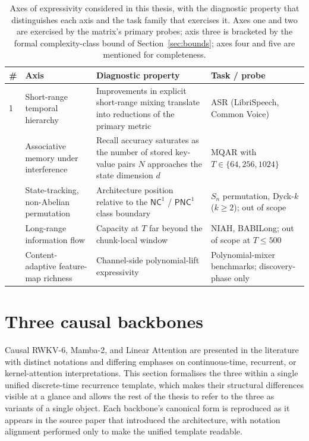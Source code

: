\begin{table}[t]
\centering
\small
\caption[Axes of expressivity for causal linear-time RNNs]{Axes
of expressivity considered in this thesis, with the diagnostic
property that distinguishes each axis and the task family that
exercises it. Axes one and two are exercised by the matrix's
primary probes; axis three is bracketed by the formal
complexity-class bound of Section~\ref{sec:bounds}; axes four
and five are mentioned for completeness.}
\label{tab:axes}
\setlength{\tabcolsep}{4pt}
\renewcommand{\arraystretch}{1.15}
\begin{tabularx}{\linewidth}{@{}p{0.4cm} p{3.0cm} X p{3.0cm}@{}}
\toprule
\textbf{\#} & \textbf{Axis} & \textbf{Diagnostic property} & \textbf{Task / probe} \\
\midrule
1 &
Short-range temporal hierarchy &
Improvements in explicit short-range mixing translate into
reductions of the primary metric &
ASR (LibriSpeech, Common Voice) \\
\addlinespace
2 &
Associative memory under interference &
Recall accuracy saturates as the number of stored key-value pairs
$N$ approaches the state dimension $d$ &
MQAR with $T \in \{64, 256, 1024\}$ \\
\addlinespace
3 &
State-tracking, non-Abelian permutation &
Architecture position relative to the $\mathsf{NC}^{1}$ /
$\mathsf{PNC}^{1}$ class boundary &
$S_{n}$ permutation, Dyck-$k$ ($k \ge 2$); out of scope \\
\addlinespace
4 &
Long-range information flow &
Capacity at $T$ far beyond the chunk-local window &
NIAH, BABILong; out of scope at $T \le 500$ \\
\addlinespace
5 &
Content-adaptive feature-map richness &
Channel-side polynomial-lift expressivity &
Polynomial-mixer benchmarks; discovery-phase only \\
\bottomrule
\end{tabularx}
\end{table}

\section{Three causal backbones}\label{sec:backbones}

Causal RWKV-6, Mamba-2, and Linear Attention are presented in the
literature with distinct notations and differing emphases on
continuous-time, recurrent, or kernel-attention interpretations. This
section formalises the three within a single unified discrete-time
recurrence template, which makes their structural differences visible
at a glance and allows the rest of the thesis to refer to the three
as variants of a single object. Each backbone's canonical form is
reproduced as it appears in the source paper that introduced the
architecture, with notation alignment performed only to make the
unified template readable.

